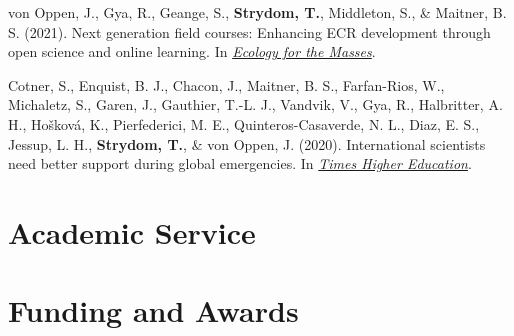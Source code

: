 \documentclass[11pt, a4paper]{awesome-cv}
\begin{document}
\hypertarget{refs_popular}{}
\leavevmode\hypertarget{ref-NextGen2021}{}%
von Oppen, J., Gya, R., Geange, S., \textbf{Strydom, T.}, Middleton, S.,
\& Maitner, B. S. (2021). Next generation field courses: Enhancing ECR
development through open science and online learning. In
\emph{\href{https://ecologyforthemasses.com/2021/03/08/next-generation-field-courses-enhancing-ecr-development-through-open-science-and-online-learning/}{Ecology
for the Masses}}.

\leavevmode\hypertarget{ref-peru2020}{}%
Cotner, S., Enquist, B. J., Chacon, J., Maitner, B. S., Farfan-Rios, W.,
Michaletz, S., Garen, J., Gauthier, T.-L. J., Vandvik, V., Gya, R.,
Halbritter, A. H., Hošková, K., Pierfederici, M. E.,
Quinteros-Casaverde, N. L., Diaz, E. S., Jessup, L. H.,
\textbf{Strydom, T.}, \& von Oppen, J. (2020). International scientists
need better support during global emergencies. In
\emph{\href{https://tinyurl.com/y5ccw9nb}{Times Higher Education}}.

\endgroup

\newpage

\hypertarget{academic-service}{%
\section{Academic Service}\label{academic-service}}

\begin{cventries}
    \vspace{-4.0mm}
    \vspace{-4.0mm}
    \vspace{-4.0mm}
\end{cventries}

\hypertarget{funding-and-awards}{%
\section{Funding and Awards}\label{funding-and-awards}}

\begin{cventries}
    \vspace{-4.0mm}
    \vspace{-4.0mm}
\end{cventries}
\end{document}
